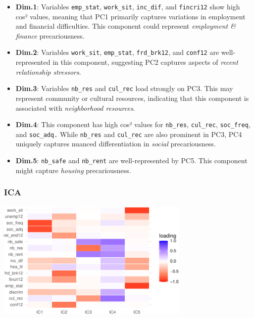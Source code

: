 \documentclass[
]{article}
\begin{document}
\begin{itemize}
\item
  \textbf{Dim.1}: Variables \texttt{emp\_stat}, \texttt{work\_sit},
  \texttt{inc\_dif}, and \texttt{fincri12} show high cos² values,
  meaning that PC1 primarily captures variations in employment and
  financial difficulties. This component could represent
  \emph{employment \& finance} precariousness.
\item
  \textbf{Dim.2}: Variables \texttt{work\_sit}, \texttt{emp\_stat},
  \texttt{frd\_brk12}, and \texttt{conf12} are well-represented in this
  component, suggesting PC2 captures aspects of \emph{recent
  relationship stressors}.
\item
  \textbf{Dim.3}: Variables \texttt{nb\_res} and \texttt{cul\_rec} load
  strongly on PC3. This may represent community or cultural resources,
  indicating that this component is associated with \emph{neighborhood
  resources}.
\item
  \textbf{Dim.4}: This component has high cos² values for
  \texttt{nb\_res}, \texttt{cul\_rec}, \texttt{soc\_freq}, and
  \texttt{soc\_adq.} While \texttt{nb\_res} and \texttt{cul\_rec} are
  also prominent in PC3, PC4 uniquely captures nuanced differentiation
  in \emph{social} precariousness.
\item
  \textbf{Dim.5}: \texttt{nb\_safe} and \texttt{nb\_rent} are
  well-represented by PC5. This component might capture \emph{housing}
  precariousness.
\end{itemize}

\subsubsection{ICA}\label{ica}

\begin{center}
\includegraphics[width=0.7\textwidth,height=\textheight]{draft_v3_files/figure-pdf/unnamed-chunk-18-1.pdf}
\end{center}
\end{document}
